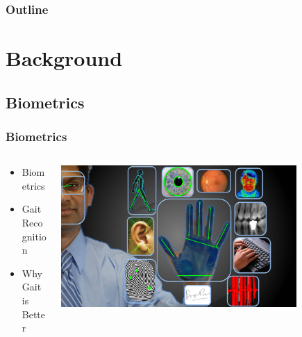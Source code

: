 \documentclass{beamer}
\begin{document}
\begin{frame}
  \frametitle{Outline}
  \tableofcontents[hideallsubsections]
\end{frame}





\section[Mobile Security]{Background}

\subsection{Biometrics}
\begin{frame}
  \frametitle{Biometrics}

  \begin{columns}
  \begin{column}{0.4\textwidth}
  \begin{itemize}
    \item Biometrics 
  	\linebreak
  	\item Gait Recognition
  	\linebreak
	\item Why Gait is Better
  \end{itemize}
  \end{column}
  \begin{column}{0.8\textwidth}
   \includegraphics[width=0.8\textwidth]{Illustrations/allbiometrics.jpg}
  \end{column}
  \end{columns}
\end{frame}
\end{document}
